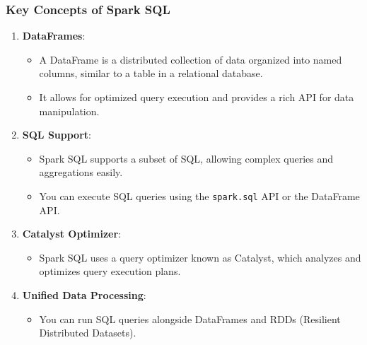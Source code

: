 \documentclass[aspectratio=169]{beamer}
\begin{document}
\begin{frame}[fragile]
    \frametitle{Key Concepts of Spark SQL}
    \begin{enumerate}
        \item \textbf{DataFrames}:
        \begin{itemize}
            \item A DataFrame is a distributed collection of data organized into named columns, similar to a table in a relational database.
            \item It allows for optimized query execution and provides a rich API for data manipulation.
        \end{itemize}

        \item \textbf{SQL Support}:
        \begin{itemize}
            \item Spark SQL supports a subset of SQL, allowing complex queries and aggregations easily.
            \item You can execute SQL queries using the \texttt{spark.sql} API or the DataFrame API.
        \end{itemize}

        \item \textbf{Catalyst Optimizer}:
        \begin{itemize}
            \item Spark SQL uses a query optimizer known as Catalyst, which analyzes and optimizes query execution plans.
        \end{itemize}

        \item \textbf{Unified Data Processing}:
        \begin{itemize}
            \item You can run SQL queries alongside DataFrames and RDDs (Resilient Distributed Datasets).
        \end{itemize}
    \end{enumerate}
\end{frame}
\end{document}
